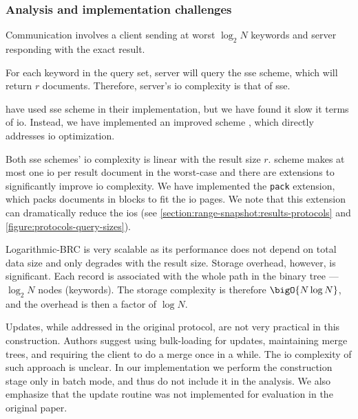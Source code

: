 	\subsubsection{Analysis and implementation challenges}

		Communication involves a client sending at worst $\log_2 N$ keywords and server responding with the exact result.

		For each keyword in the query set, server will query the \acrshort{sse} scheme, which will return $r$ documents.
		Therefore, server's \acrshort{io} complexity is that of \acrshort{sse}.

		\textcite{practical-range-search} have used \cite{cjjkrs-13} \acrshort{sse} scheme in their implementation, but we have found it slow it terms of \acrshort{io}.
		Instead, we have implemented an improved scheme \cite{cjjjkrs-14}, which directly addresses \acrshort{io} optimization.

		Both \acrshort{sse} schemes' \acrshort{io} complexity is linear with the result size $r$.
		\cite{cjjjkrs-14} scheme makes at most one \acrshort{io} per result document in the worst-case and there are extensions to significantly improve \acrshort{io} complexity. %
		We have implemented the \texttt{pack} extension, which packs documents in blocks to fit the \acrshort{io} pages.
		We note that this extension can dramatically reduce the \acrshort{io}s (see \cref{section:range-snapshot:results-protocols} and \cref{figure:protocols-query-sizes}).

		Logarithmic-BRC is very scalable as its performance does not depend on total data size and only degrades with the result size.
		Storage overhead, however, is significant.
		Each record is associated with the whole path in the binary tree --- $\log_2 N$ nodes (keywords).
		The storage complexity is therefore $\bigO{N \log N}$, and the overhead is then a factor of $\log N$.

		Updates, while addressed in the original protocol, are not very practical in this construction.
		Authors suggest using bulk-loading for updates, maintaining merge trees, and requiring the client to do a merge once in a while.
		The \acrshort{io} complexity of such approach is unclear.
		In our implementation we perform the construction stage only in batch mode, and thus do not include it in the analysis.
		We also emphasize that the update routine was not implemented for evaluation in the original paper.
